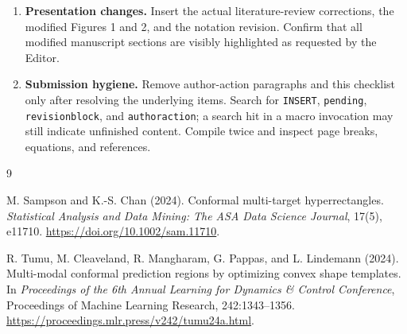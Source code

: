 \documentclass[11pt]{article}
\numberwithin{equation}{section}
\begin{document}
\begin{enumerate}
 correct full-length versus normalized-volume convention.
 \item \textbf{Presentation changes.} Insert the actual
 literature-review corrections, the modified Figures 1
 and 2, and the notation revision. Confirm that all
 modified manuscript sections are visibly highlighted
 as requested by the Editor.
 \item \textbf{Submission hygiene.} Remove author-action
 paragraphs and this checklist only after resolving the
 underlying items. Search for \texttt{INSERT},
 \texttt{pending}, \texttt{revisionblock}, and
 \texttt{authoraction}; a search hit in a macro invocation
 may still indicate unfinished content. Compile twice
 and inspect page breaks, equations, and references.
\end{enumerate}

\begin{thebibliography}{9}

M. Sampson and K.-S. Chan (2024).
Conformal multi-target hyperrectangles.
\emph{Statistical Analysis and Data Mining: The ASA Data Science Journal},
17(5), e11710.
\url{https://doi.org/10.1002/sam.11710}.

R. Tumu, M. Cleaveland, R. Mangharam, G. Pappas, and L. Lindemann (2024).
Multi-modal conformal prediction regions by optimizing convex shape
templates.
In \emph{Proceedings of the 6th Annual Learning for Dynamics \& Control
Conference}, Proceedings of Machine Learning Research, 242:1343--1356.
\url{https://proceedings.mlr.press/v242/tumu24a.html}.

\end{thebibliography}
\end{document}
